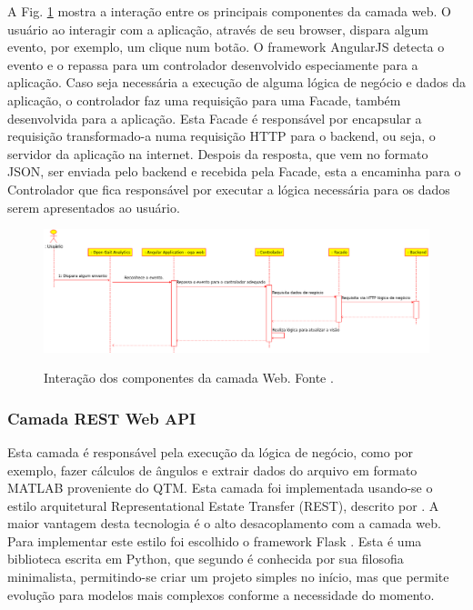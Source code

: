 \documentclass[journal]{IEEEtran}
\begin{document}
A Fig. \ref{camada_web} mostra a interação entre os principais componentes da camada web.
O usuário ao interagir com a aplicação, através de seu browser, dispara algum evento, 
por exemplo, um clique num botão. O framework AngularJS detecta o evento e o repassa
para um controlador desenvolvido especiamente para a aplicação. Caso seja necessária 
a execução de alguma lógica de negócio e dados da aplicação, o controlador faz uma
requisição para uma Facade, também desenvolvida para a aplicação. Esta Facade é responsável
por encapsular a requisição transformado-a numa requisição HTTP para o backend, ou seja, 
o servidor da aplicação na internet. Despois da resposta, que vem no formato JSON, ser
enviada pelo backend e recebida pela Facade, esta a encaminha para o Controlador que
fica responsável por executar a lógica necessária para os dados serem apresentados ao 
usuário.

\begin{figure}[tb]
	\centering
	{\includegraphics[width=\textwidth]{camada_web}}
	\caption{Interação dos componentes da camada Web. Fonte \cite{Lima2015}.}
	\label{camada_web}
\end{figure}

\subsubsection{Camada REST Web API}

Esta camada é responsável pela execução da lógica de negócio, como por exemplo,
fazer cálculos de ângulos e extrair dados do arquivo em formato MATLAB proveniente do QTM.
Esta camada foi implementada usando-se o estilo arquitetural Representational Estate Transfer (REST),
descrito por \cite{Grinberg2014}. A maior vantagem desta tecnologia é o alto desacoplamento com a
camada web. Para implementar este estilo foi escolhido o framework Flask \cite{Maia2015}. Esta é 
uma biblioteca escrita em Python,  que segundo \cite{Maia2015} é conhecida por sua filosofia minimalista,
permitindo-se criar um projeto simples no início, mas que permite evolução para modelos
mais complexos conforme a necessidade do momento.
\end{document}
